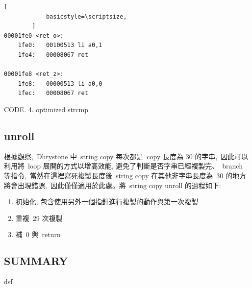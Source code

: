 \documentclass{article}
\begin{document}
\begin{CJK*}{UTF8}{bsmi}
\begin{multicols}{2}
\begin{flushleft}
\begin{center}
\begin{lstlisting}[
            basicstyle=\scriptsize, 
        ]
00001fe0 <ret_o>:
    1fe0:	00100513 li	a0,1
    1fe4:	00008067 ret

00001fe8 <ret_z>:
    1fe8:	00000513 li	a0,0
    1fec:	00008067 ret
        \end{lstlisting}
        \small CODE. 4. optimized strcmp
    \end{center}    
\end{flushleft}

\begin{center}
    \subsection*{unroll}    
    根據觀察,\ Dhrystone 中\ string copy 每次都是\ copy 長度為 30 的字串,\
    因此可以利用將\ loop 展開的方式以增高效能, 避免了判斷是否字串已經複製完、\ branch 等指令,\
    當然在這裡寫死複製長度後\ string copy 在其他非字串長度為\ 30 的地方將會出現錯誤,\
    因此僅僅適用於此處。將\ string copy unroll 的過程如下:
    \begin{enumerate}
        \item 初始化, 包含使用另外一個指針進行複製的動作與第一次複製
        \item 重複\ 29 次複製
        \item 補\ 0 與\ return
    \end{enumerate}
\end{center}

\begin{center}
    \section*{SUMMARY}
    dsf
\end{center}

\section*{}

\end{multicols}

\end{CJK*}
\end{document}
